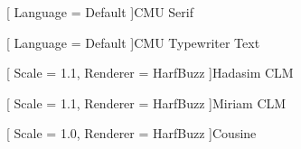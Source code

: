 \usepackage[
    bidi = basic,
    english
]{babel}


[
    Language    = Default
]{CMU Serif}

[
    Language    = Default
]{CMU Typewriter Text}

[
    Scale       = 1.1,
    Renderer    = HarfBuzz
]{Hadasim CLM}

[
    Scale       = 1.1,
    Renderer    = HarfBuzz
]{Miriam CLM}

[
    Scale       = 1.0,
    Renderer    = HarfBuzz
]{Cousine}




\usepackage{yfonts}


\usepackage{relsize}

